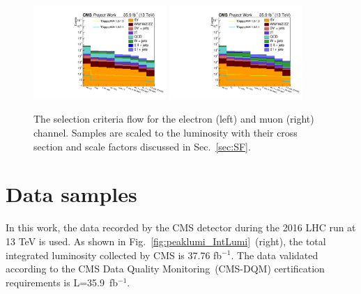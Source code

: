  \begin{figure}[!hbt]
    \begin{center}
    \includegraphics[width=0.45\textwidth]{Plots/analysis/cutflow/electron}
     \includegraphics[width=0.45\textwidth]{Plots/analysis/cutflow/muon}
  \caption{ \label{fig:plotFlow} The selection criteria flow for the electron (left) and muon (right) channel. Samples are scaled to the luminosity with their cross section and scale factors discussed in Sec.~\ref{sec:SF}.
  }
   \end{center}
\end{figure}
\newpage
\section{Data samples}
In this work, the data recorded by the CMS detector during the 2016 LHC run at 13 TeV is used. As shown in Fig.~\ref{fig:peaklumi_IntLumi}~(right), the total integrated luminosity collected by CMS is 37.76 fb$^{-1}$. The data validated according to the CMS Data Quality Monitoring~(CMS-DQM) certification requirements is L=35.9~fb$^{-1}$.
